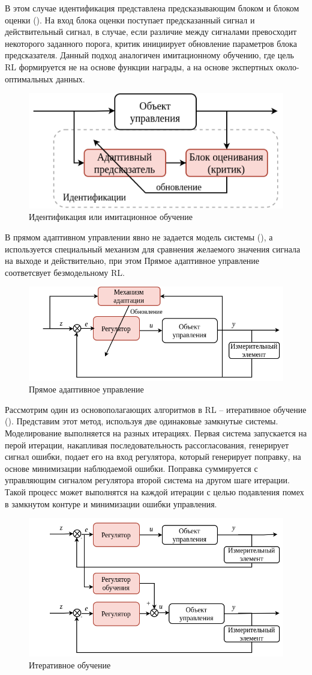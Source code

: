 В этом случае идентификация представлена предсказывающим блоком и блоком оценки (). На вход блока оценки поступает предсказанный сигнал и действительный сигнал, в случае, если различие между сигналами превосходит некоторого заданного порога, критик инициирует обновление параметров блока предсказателя. Данный подход аналогичен имитационному обучению, где цель RL формируется не на основе функции награды, а на основе экспертных около-оптимальных данных.
\begin{figure}[ht!] 
	\centering
	\includegraphics[width=0.4\linewidth]{my_folder/figure/schema/adapt2.png}
	\caption{Идентификация или имитационное обучение}
	\label{fig:r_adap2-ch2}
\end{figure}
%
В прямом адаптивном управлении явно не задается модель системы (), а используется специальный механизм для сравнения желаемого значения сигнала на выходе и действительно, при этом
Прямое адаптивное управление соответсвует безмодельному RL.
%
\begin{figure}[ht!] 
	\centering
	\includegraphics[width=0.4\linewidth]{my_folder/figure/schema/adapt3.png}
	\caption{Прямое адаптивное управление}
	\label{fig:r_adap-ch2}
\end{figure}
Рассмотрим один из основополагающих алгоритмов в RL -- итеративное обучение (). Представим этот метод, используя две одинаковые замкнутые системы. Моделирование выполняется на разных итерациях. Первая система запускается на перой итерации, накапливая последовательность рассогласования, генерирует сигнал ошибки, подает его на вход регулятора, который генерирует поправку, на основе минимизации наблюдаемой ошибки. Поправка суммируется с управляющим сигналом регулятора второй система на другом шаге итерации. Такой процесс может выполнятся на каждой итерации с целью подавления помех в замкнутом контуре и минимизации ошибки управления.

\begin{figure}[ht!] 
	\centering
	\includegraphics[width=0.6\linewidth]{my_folder/figure/schema/adapt4.png}
	\caption{Итеративное обучение}
	\label{fig:r_adap4-ch2}
\end{figure}


